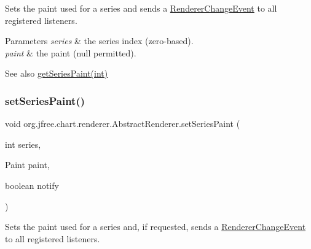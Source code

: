 Sets the paint used for a series and sends a \mbox{\hyperlink{}{Renderer\+Change\+Event}} to all registered listeners.


\begin{DoxyParams}{Parameters}
{\em series} & the series index (zero-\/based). \\
\hline
{\em paint} & the paint ({\ttfamily null} permitted).\\
\hline
\end{DoxyParams}
\begin{DoxySeeAlso}{See also}
\mbox{\hyperlink{classorg_1_1jfree_1_1chart_1_1renderer_1_1_abstract_renderer_a34de4b630890c8c5ec3b4157cb709ec9}{get\+Series\+Paint(int)}} 
\end{DoxySeeAlso}
\mbox{\label{classorg_1_1jfree_1_1chart_1_1renderer_1_1_abstract_renderer_aad8379727e0dc62165d7e3d61412d53d}} 
\subsubsection{\texorpdfstring{set\+Series\+Paint()}{setSeriesPaint()}\hspace{0.1cm}{\footnotesize\ttfamily [2/2]}}
{\footnotesize\ttfamily void org.\+jfree.\+chart.\+renderer.\+Abstract\+Renderer.\+set\+Series\+Paint (\begin{DoxyParamCaption}\item[{int}]{series,  }\item[{Paint}]{paint,  }\item[{boolean}]{notify }\end{DoxyParamCaption})}

Sets the paint used for a series and, if requested, sends a \mbox{\hyperlink{}{Renderer\+Change\+Event}} to all registered listeners.


